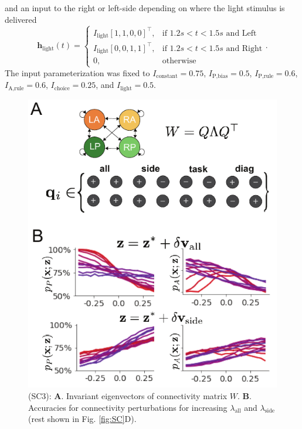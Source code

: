 \documentclass[11pt]{article}
\begin{document}
and an input to the right or left-side depending on where the light stimulus is delivered    
\begin{equation}  \mathbf{h}_{\text{light}}(t) = \begin{cases}
                           I_{\text{light}} [1, 1, 0, 0]^\top,& \text{if } 1.2s < t < 1.5s \text{ and Left} \\
                           I_{\text{light}} [0, 0, 1, 1]^\top,& \text{if } 1.2s < t < 1.5s \text{ and Right} \\
                            0,              & \text{otherwise}
                         \end{cases}.
\end{equation}
The input parameterization was fixed to $I_{\text{constant}} = 0.75$, $I_{\text{P,bias}} = 0.5 $, $I_{\text{P,rule}} = 0.6$,  $I_{\text{A,rule}} = 0.6$,  $I_{\text{choice}} = 0.25$,  and $I_{\text{light}} = 0.5$.


\begin{figure}
\begin{center}
\includegraphics[scale=0.9]{figures/figSC3/figSC3.pdf}
\end{center}
\caption{\small (SC3):  
\textbf{A}. Invariant eigenvectors of connectivity matrix $W$.
\textbf{B}. Accuracies for connectivity perturbations for increasing $\lambda_{\text{all}}$ and $\lambda_{\text{side}}$ (rest shown in Fig. \ref{fig:SC}D).
}
\label{fig:SC3}
\end{figure}
\end{document}
